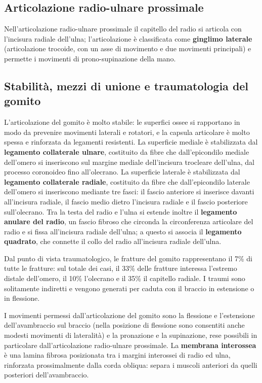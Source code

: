 \subsection{Articolazione radio-ulnare prossimale}

Nell'articolazione radio-ulnare prossimale il capitello del radio si
articola con l'incisura radiale dell'ulna; l'articolazione è classificata
come \textbf{ginglimo laterale} (articolazione trocoide, con un asse di
movimento e due movimenti principali) e permette i movimenti di
prono-supinazione della mano.

\subsection{Stabilità, mezzi di unione e traumatologia del gomito}

L'articolazione del gomito è molto stabile: le superfici ossee si
rapportano in modo da prevenire movimenti laterali e rotatori, e la
capsula articolare è molto spessa e rinforzata da legamenti resistenti.
La superficie mediale è stabilizzata dal \textbf{legamento collaterale
ulnare}, costituito da fibre che dall'epicondilo mediale dell'omero si
inseriscono sul margine mediale dell'incisura trocleare dell'ulna, dal
processo coronoideo fino all'olecrano. La superficie laterale è
stabilizzata dal \textbf{legamento collaterale radiale}, costituito da
fibre che dall'epicondilo laterale dell'omero si inseriscono mediante tre
fasci: il fascio anteriore si inserisce davanti all'incisura radiale, il
fascio medio dietro l'incisura radiale e il fascio posteriore
sull'olecrano. Tra la testa del radio e l'ulna si estende inoltre il
\textbf{legamento anulare del radio}, un fascio fibroso che circonda la
circonferenza articolare del radio e si fissa all'incisura radiale
dell'ulna; a questo si associa il \textbf{legamento quadrato}, che connette
il collo del radio all'incisura radiale dell'ulna.

Dal punto di vista traumatologico, le fratture del gomito rappresentano il
7\% di tutte le fratture: sul totale dei casi, il 33\% delle fratture
interessa l'estremo distale dell'omero, il 10\% l'olecrano e il 35\% il
capitello radiale. I traumi sono solitamente indiretti e vengono generati
per caduta con il braccio in estensione o in flessione.

I movimenti permessi dall'articolazione del gomito sono la flessione e
l'estensione dell'avambraccio sul braccio (nella posizione di flessione
sono consentiti anche modesti movimenti di lateralità) e la pronazione e
la supinazione, rese possibili in particolare dall'articolazione
radio-ulnare prossimale. La \textbf{membrana interossea} è una lamina
fibrosa posizionata tra i margini interossei di radio ed ulna, rinforzata
prossimalmente dalla corda obliqua: separa i muscoli anteriori da quelli
posteriori dell'avambraccio.

